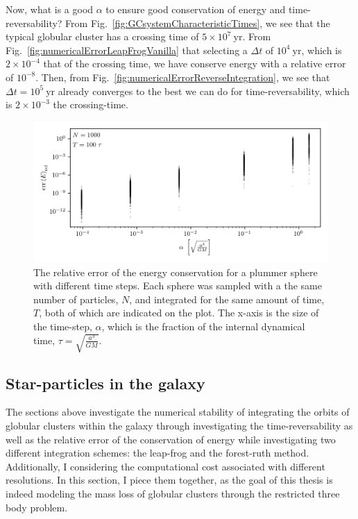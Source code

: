         
        Now, what is a good $\alpha$ to ensure good conservation of energy and time-reversability? From Fig.~\ref{fig:GCsystemCharacteristicTimes}, we see that the typical globular cluster has a crossing time of $5\times10^{7}~\mathrm{yr}$. From Fig.~\ref{fig:numericalErrorLeapFrogVanilla} that selecting a $\Delta t$ of $10^{4}~\mathrm{yr}$, which is $2\times 10^{-4}$ that of the crossing time, we have conserve energy with a relative error of $10^{-8}$. Then, from Fig.~\ref{fig:numericalErrorReverseIntegration}, we see that $\Delta t= 10^{5}~\mathrm{yr}$ already converges to the best we can do for time-reversability, which is $2\times10^{-3}$ the crossing-time. 


        \begin{figure}
            \centering
            \includegraphics[width=\linewidth]{images/numericalErrorStaticPlummerSphereEnergyError.png}
            \caption{The relative error of the energy conservation for a plummer sphere with different time steps. Each sphere was sampled with a the same number of particles, $N$, and integrated for the same amount of time, $T$, both of which are indicated on the plot. The x-axis is the size of the time-step, $\alpha$, which is the fraction of the internal dynamical time, $\tau = \sqrt{\frac{a^3}{GM}}$. }
            \label{fig:numericalErrorStaticPlummerSphereEnergyError}
        \end{figure}

    \subsection{Star-particles in the galaxy}

        The sections above investigate the numerical stability of integrating the orbits of globular clusters within the galaxy through investigating the time-reversability as well as the relative error of the conservation of energy while investigating two different integration schemes: the leap-frog and the forest-ruth method. Additionally, I considering the computational cost associated with different resolutions. In this section, I piece them together, as the goal of this thesis is indeed modeling the mass loss of globular clusters through the restricted three body problem. 

